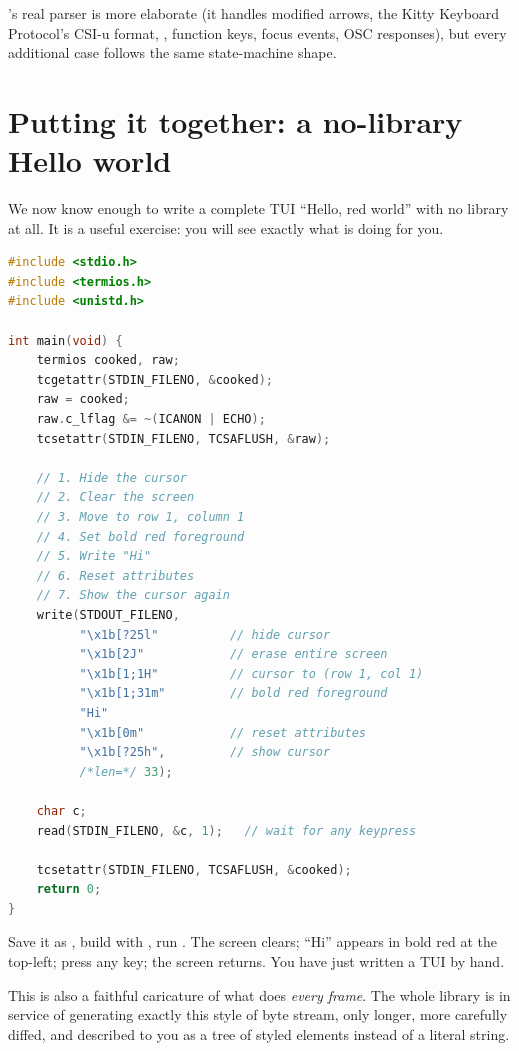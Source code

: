 \maya{}'s real parser is more elaborate (it handles modified
arrows, the Kitty Keyboard Protocol's CSI-u format,
, function keys, focus events, OSC
responses), but every additional case follows the same state-machine
shape.

\section{Putting it together: a no-library Hello world}

We now know enough to write a complete TUI ``Hello, red world'' with
no library at all. It is a useful exercise: you will see exactly what
\maya{} is doing for you.

\begin{lstlisting}[language=C]
#include <stdio.h>
#include <termios.h>
#include <unistd.h>

int main(void) {
    termios cooked, raw;
    tcgetattr(STDIN_FILENO, &cooked);
    raw = cooked;
    raw.c_lflag &= ~(ICANON | ECHO);
    tcsetattr(STDIN_FILENO, TCSAFLUSH, &raw);

    // 1. Hide the cursor
    // 2. Clear the screen
    // 3. Move to row 1, column 1
    // 4. Set bold red foreground
    // 5. Write "Hi"
    // 6. Reset attributes
    // 7. Show the cursor again
    write(STDOUT_FILENO,
          "\x1b[?25l"          // hide cursor
          "\x1b[2J"            // erase entire screen
          "\x1b[1;1H"          // cursor to (row 1, col 1)
          "\x1b[1;31m"         // bold red foreground
          "Hi"
          "\x1b[0m"            // reset attributes
          "\x1b[?25h",         // show cursor
          /*len=*/ 33);

    char c;
    read(STDIN_FILENO, &c, 1);   // wait for any keypress

    tcsetattr(STDIN_FILENO, TCSAFLUSH, &cooked);
    return 0;
}
\end{lstlisting}

Save it as , build with , run
. The screen clears; ``Hi'' appears in bold red at the
top-left; press any key; the screen returns. You have just written a
TUI by hand.

This is also a faithful caricature of what \maya{} does \emph{every
frame}. The whole library is in service of generating exactly this
style of byte stream, only longer, more carefully diffed, and
described to you as a tree of styled elements instead of a literal
string.

